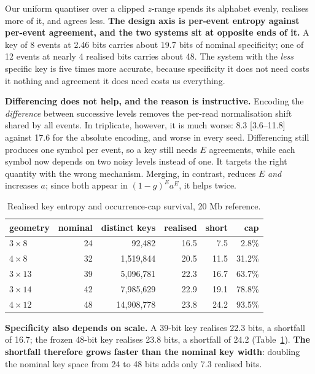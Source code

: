 \documentclass[conference]{IEEEtran}
\begin{document}
Our uniform quantiser over a clipped $z$-range spends its alphabet evenly, realises more of it,
and agrees less. \textbf{The design axis is per-event entropy against per-event agreement, and
the two systems sit at opposite ends of it.} A key of 8 events at 2.46 bits carries about 19.7
bits of nominal specificity; one of 12 events at nearly 4 realised bits carries about 48. The
system with the \emph{less} specific key is five times more accurate, because specificity it
does not need costs it nothing and agreement it does need costs us everything.

\textbf{Differencing does not help, and the reason is instructive.} Encoding the
\emph{difference} between successive levels removes the per-read normalisation shift shared by
all events. In triplicate, however, it is much worse: 8.3 [3.6--11.8] against 17.6 for the
absolute encoding, and worse in every seed. Differencing still produces one symbol per event, so
a key still needs $E$ agreements, while each symbol now depends on two noisy levels instead of
one. It targets the right quantity with the wrong mechanism. Merging, in contrast, reduces $E$
\emph{and} increases $a$; since both appear in $(1-g)^{E} a^{E}$, it helps twice.

\begin{table}[t]
\caption{Realised key entropy and occurrence-cap survival, 20 Mb reference.}
\label{tab:entropy}
\centering
\scriptsize
\begin{tabular}{lrrrrr}
\toprule
geometry & nominal & distinct keys & realised & short & cap \\
\midrule
$3 \times 8$  & 24 & 92,482     & 16.5 & 7.5  & 2.8\%  \\
$4 \times 8$  & 32 & 1,519,844  & 20.5 & 11.5 & 31.2\% \\
$3 \times 13$ & 39 & 5,096,781  & 22.3 & 16.7 & 63.7\% \\
$3 \times 14$ & 42 & 7,985,629  & 22.9 & 19.1 & 78.8\% \\
$4 \times 12$ & 48 & 14,908,778 & 23.8 & 24.2 & 93.5\% \\
\bottomrule
\end{tabular}
\end{table}

\textbf{Specificity also depends on scale.} A 39-bit key realises 22.3 bits, a shortfall of 16.7;
the frozen 48-bit key realises 23.8 bits, a shortfall of 24.2 (Table~\ref{tab:entropy}). \textbf{The shortfall therefore grows faster than the nominal key
width}: doubling the nominal key space from 24 to 48 bits adds only 7.3 realised bits.
\end{document}
